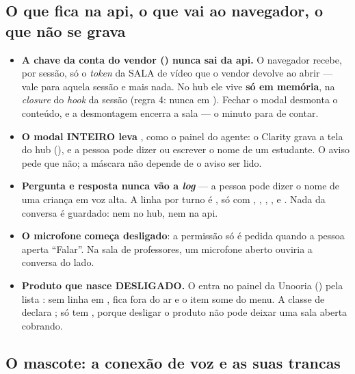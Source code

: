 \subsection{O que fica na api, o que vai ao navegador, o que não se grava}

\begin{itemize}
  \item \textbf{A chave da conta do vendor () nunca
    sai da api.} O navegador recebe, por sessão, só o \emph{token} da SALA de
    vídeo que o vendor devolve ao abrir --- vale para aquela sessão e mais
    nada. No hub ele vive \textbf{só em memória}, na \emph{closure} do
    \emph{hook} da sessão (regra 4: nunca em ). Fechar o modal
    desmonta o conteúdo, e a desmontagem encerra a sala --- o minuto para de
    contar.
  \item \textbf{O modal INTEIRO leva }, como o
    painel do agente: o Clarity grava a tela do hub (), e a pessoa
    pode dizer ou escrever o nome de um estudante. O aviso pede que não; a
    máscara não depende de o aviso ser lido.
  \item \textbf{Pergunta e resposta nunca vão a \emph{log}} --- a pessoa pode
    dizer o nome de uma criança em voz alta. A linha por turno é
    , só com , , ,
    ,  e . Nada da conversa é guardado:
    nem no hub, nem na api.
  \item \textbf{O microfone começa desligado}: a permissão só é pedida quando a
    pessoa aperta \enquote{Falar}. Na sala de professores, um microfone aberto
    ouviria a conversa do lado.
  \item \textbf{Produto que nasce DESLIGADO.} O  entra no painel da
    Unooria () pela lista :
    sem linha em , fica fora do ar e o item some do menu.
    A classe de  declara ; só
     tem ,
    porque desligar o produto não pode deixar uma sala aberta cobrando.
\end{itemize}

\subsection{O mascote: a conexão de voz e as suas trancas}

